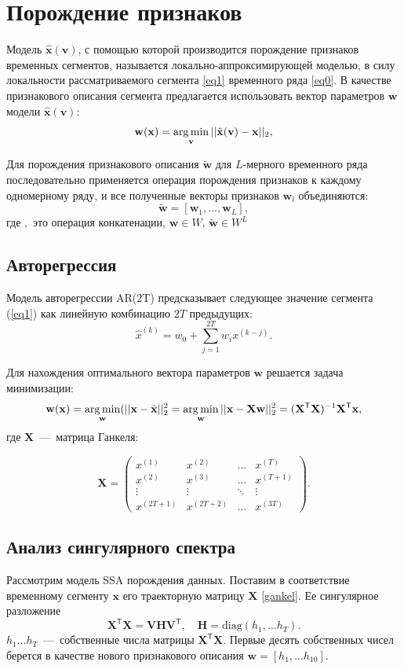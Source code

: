 \documentclass[12pt, twoside]{article}
\begin{document}
\section{Порождение признаков}

Модель $\hat{\mathbf{x}}(\mathbf{v})$, с помощью которой производится порождение признаков временных сегментов, называется локально-аппроксимирующей моделью, в силу локальности рассматриваемого сегмента \eqref{eq1} временного ряда \eqref{eq0}. В качестве признакового описания сегмента предлагается использовать вектор параметров $\mathbf{w}$ модели $\hat{\mathbf{x}}(\mathbf{v})$: 
$$\mathbf{w}(\mathbf{x})=\argmin\limits_{\mathbf{v}}||\hat{\mathbf{x}}(\mathbf{v})-\mathbf{x}||_2,$$

Для порождения признакового описания $\widetilde{\mathbf{w}}$ для $L$-мерного временного ряда последовательно применяется операция порождения признаков к каждому одномерному ряду, и все полученные векторы признаков $\mathbf{w}_l$ объединяются:
$$\widetilde{\mathbf{w}} = [\mathbf{w}_1,\ldots,\mathbf{w}_L],$$
где $,$ это операция конкатенации, $\mathbf{w}\in W$, $\widetilde{\mathbf{w}} \in W^L$


\subsection{Авторегрессия}
Модель авторегрессии AR($2$T) предсказывает следующее значение сегмента (\ref{eq1}) как линейную комбинацию $2T$ предыдущих:
$$\hat{x}^{(k)}=w_0+\sum\limits_{j=1}^{2T} w_i x^{(k-j)}.$$

Для нахождения оптимального вектора параметров $\mathbf{w}$ решается задача минимизации:
$$\mathbf{w}(\mathbf{x})=\argmin_{\mathbf{w}}(||\mathbf{x}-\hat{\mathbf{x}}||_2^2=\argmin_{\mathbf{w}}||\mathbf{x}-\mathbf{X}\mathbf{w}||_2^2=(\mathbf{X}^\mathsf{T}\mathbf{X})^{-1}\mathbf{X}^\mathsf{T}\mathbf{x},$$
где $\mathbf{X}$~---~матрица Ганкеля:

\begin{equation*}\label{gankel}
\mathbf{X} = \left(
\begin{array}{cccc}
x^{(1)} & x^{(2)} & \ldots & x^{(T)}\\
x^{(2)} & x^{(3)} & \ldots & x^{(T+1)}\\
\vdots & \vdots & \ddots & \vdots\\
x^{(2T+1)} & x^{(2T+2)} & \ldots & x^{(3T)}
\end{array}
\right).
\end{equation*}

\subsection{ Анализ сингулярного спектра}
Рассмотрим модель SSA порождения данных. Поставим в соответствие временному сегменту $\mathbf{x}$ его траекторную матрицу $\mathbf{X}$ \eqref{gankel}. Ее сингулярное разложение 
$$\mathbf{X}^\mathsf{T}\mathbf{X}=\mathbf{V}\mathbf{H}\mathbf{V}^\mathsf{T},\quad \mathbf{H} = \text{diag}(h_1,\ldots h_T).$$ 
$h_1\ldots h_T$~---~собственные числа матрицы $\mathbf{X}^\mathsf{T}\mathbf{X}$. Первые десять собственных чисел берется в качестве нового признакового описания $\mathbf{w}=[h_1,\ldots h_{10}]$.  
\end{document}
